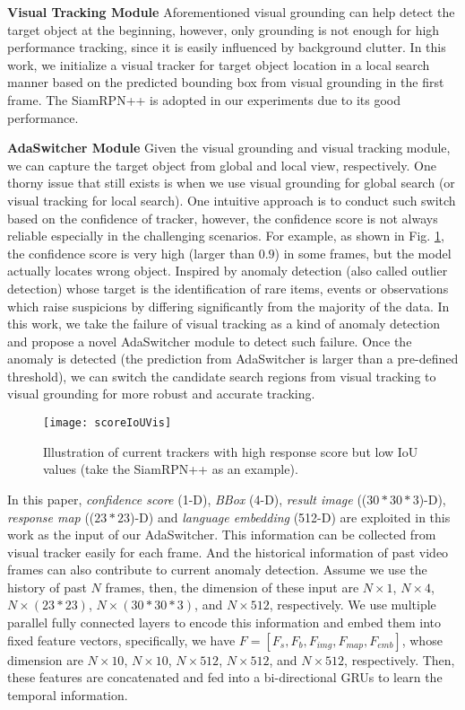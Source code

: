 \documentclass[final]{cvpr}
\begin{document}
\textbf{Visual Tracking Module} 
Aforementioned visual grounding can help detect the target object at the beginning, however, only grounding is not enough for high performance tracking, since it is easily influenced by background clutter. In this work, we initialize a  visual tracker for target object location in a local search manner based on the predicted bounding box from visual grounding in the first frame. The SiamRPN++ \cite{li2018siamrpn++} is adopted in our experiments due to its good performance. 




\textbf{AdaSwitcher Module} 
Given the visual grounding and visual tracking module, we can capture the target object from global and local view, respectively. One thorny issue that still exists is when we use visual grounding for global search (or visual tracking for local search). One intuitive approach is to conduct such switch based on the confidence of tracker, however, the confidence score is not always reliable especially in the challenging scenarios. For example, as shown in Fig. \ref{scoreIoUVis}, the confidence score is very high (larger than $0.9$) in some frames, but the model actually locates wrong object. Inspired by anomaly detection (also called outlier detection) whose target is the identification of rare items, events or observations which raise suspicions by differing significantly from the majority of the data. In this work, we take the failure of visual tracking as a kind of anomaly detection and propose a novel AdaSwitcher module to detect such failure. Once the anomaly is detected (the prediction from AdaSwitcher is larger than a pre-defined threshold), we can switch the candidate search regions from visual tracking to visual grounding for more robust and accurate tracking. 


\begin{figure} 
\center
\texttt{[image: scoreIoUVis]}
\caption{Illustration of current trackers with high response score but low IoU values (take the SiamRPN++ \cite{li2018siamrpn++} as an example).}   
\label{scoreIoUVis}
\end{figure} 	


In this paper, \emph{confidence score} (1-D), \emph{BBox} (4-D), \emph{result image} (($30*30*3$)-D), \emph{response map} (($23*23$)-D) and \emph{language embedding} (512-D) are exploited in this work as the input of our AdaSwitcher. This information can be collected from visual tracker easily for each frame. And the historical information of past video frames can also contribute to current anomaly detection. Assume we use the history of past $N$ frames, then, the dimension of these input are $N \times 1$, $N \times 4$, $N \times (23*23)$, $N \times (30*30*3)$, and $N \times 512$, respectively. We use multiple parallel fully connected layers to encode this information and embed them into fixed feature vectors, specifically, we have $F = [F_s, F_b, F_{img}, F_{map}, F_{emb}]$, whose dimension are $N \times 10$, $N \times 10$, $N \times 512$, $N \times 512$, and $N \times 512$, respectively. Then, these features are concatenated and fed into a bi-directional GRUs \cite{chung2014GRUs} to learn the temporal information. 
\end{document}
